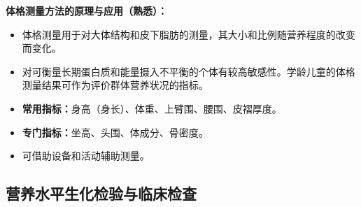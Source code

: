 \begin{defbox}
\textbf{体格测量方法的原理与应用（熟悉）：}
\begin{itemize}[leftmargin=*]
    \item 体格测量用于对大体结构和皮下脂肪的测量，其大小和比例随营养程度的改变而变化。
    \item 对可衡量长期蛋白质和能量摄入不平衡的个体有较高敏感性。学龄儿童的体格测量结果可作为评价群体营养状况的指标。
    \item \textbf{常用指标：}身高（身长）、体重、上臂围、腰围、皮褶厚度。
    \item \textbf{专门指标：}坐高、头围、体成分、骨密度。
    \item 可借助设备和活动辅助测量。
\end{itemize}
\end{defbox}

\subsection{营养水平生化检验与临床检查}


